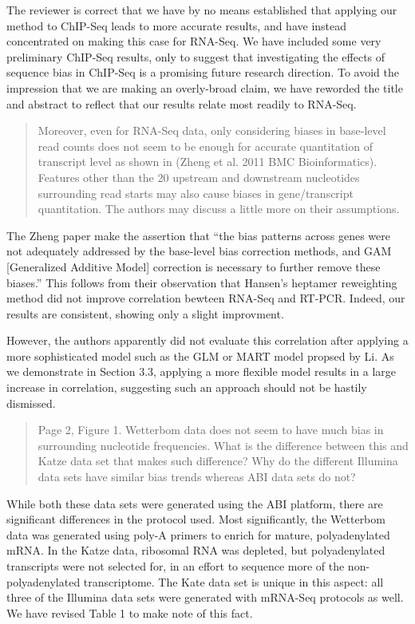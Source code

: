 \documentclass{article}
\begin{document}
The reviewer is correct that we have by no means established that applying our
method to ChIP-Seq leads to more accurate results, and have instead concentrated
on making this case for RNA-Seq. We have included some very preliminary ChIP-Seq
results, only to suggest that investigating the effects of sequence bias in
ChIP-Seq is a promising future research direction. To avoid the impression that
we are making an overly-broad claim, we have reworded the title and abstract to
reflect that our results relate most readily to RNA-Seq.


\begin{quote}
Moreover, even for RNA-Seq data, only considering biases in base-level read
counts does not seem to be enough for accurate quantitation of transcript level
as shown in (Zheng et al. 2011 BMC Bioinformatics). Features other than the 20
upstream and downstream nucleotides surrounding read starts may also cause
biases in gene/transcript quantitation. The authors may discuss a little more on
their assumptions.
\end{quote}

The Zheng paper make the assertion that ``the bias patterns across genes were
not adequately addressed by the base-level bias correction methods, and GAM
[Generalized Additive Model] correction is necessary to further remove these
biases.'' This follows from their observation that Hansen's heptamer reweighting
method did not improve correlation bewteen RNA-Seq and RT-PCR. Indeed, our
results are consistent, showing only a slight improvment.

However, the authors apparently did not evaluate this correlation after applying
a more sophisticated model such as the GLM or MART model propsed by Li. As we
demonstrate in Section 3.3, applying a more flexible model results in a large
increase in correlation, suggesting such an approach should not be hastily
dismissed.


\begin{quote}
Page 2, Figure 1. Wetterbom data does not seem to have much bias in surrounding
nucleotide frequencies. What is the difference between this and Katze data set
that makes such difference? Why do the different Illumina data sets have similar
bias trends whereas ABI data sets do not?
\end{quote}

While both these data sets were generated using the ABI platform, there are
significant differences in the protocol used. Most significantly, the Wetterbom
data was generated using poly-A primers to enrich for mature, polyadenylated
mRNA. In the Katze data, ribosomal RNA was depleted, but polyadenylated
transcripts were not selected for, in an effort to sequence more of the
non-polyadenylated transcriptome. The Kate data set is unique in this aspect:
all three of the Illumina data sets were generated with mRNA-Seq protocols as
well.  We have revised Table 1 to make note of this fact.
\end{document}
